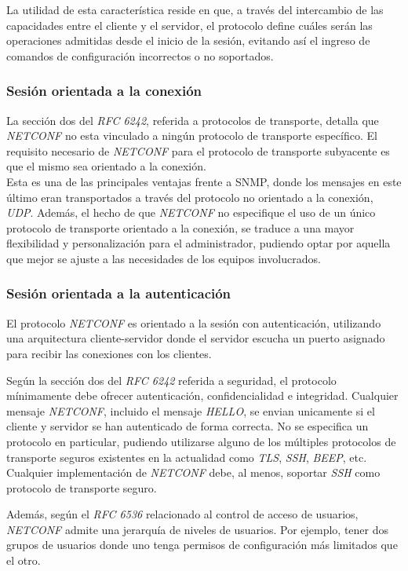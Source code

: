   La utilidad de esta característica reside en que, a través del intercambio de las capacidades entre el cliente y el servidor, el protocolo define cuáles serán las operaciones admitidas desde el inicio de la sesión, evitando así el ingreso de comandos de configuración incorrectos o no soportados. 


  \subsubsection{Sesión orientada a la conexión}
  La sección dos del \textit{RFC 6242}, referida a protocolos de transporte, detalla que \textit{NETCONF} no esta vinculado a ningún protocolo de transporte específico. El requisito necesario de \textit{NETCONF} para el protocolo de transporte subyacente es que el mismo sea orientado a la conexión. 
  \\

  Esta es una de las principales ventajas frente a SNMP, donde los mensajes en este último eran transportados a través del protocolo no orientado a la conexión, \textit{UDP}. Además, el hecho de que \textit{NETCONF} no especifique el uso de un único protocolo de transporte orientado a la conexión, se traduce a una mayor flexibilidad y personalización para el administrador, pudiendo optar por aquella que mejor se ajuste a las necesidades de los equipos involucrados.


  \subsubsection{Sesión orientada a la autenticación}
  El protocolo \textit{NETCONF} es orientado a la sesión con autenticación, utilizando una arquitectura cliente-servidor donde el servidor escucha un puerto asignado para recibir las conexiones con los clientes. 

  Según la sección dos del \textit{RFC 6242} referida a seguridad, el protocolo mínimamente debe ofrecer autenticación, confidencialidad e integridad. Cualquier mensaje \textit{NETCONF}, incluido el mensaje \textit{HELLO}, se envian unicamente si el cliente y servidor se han autenticado de forma correcta. No se especifica un protocolo en particular, pudiendo utilizarse alguno de los múltiples protocolos de transporte seguros existentes en la actualidad como \textit{TLS}, \textit{SSH}, \textit{BEEP}, etc. Cualquier implementación de \textit{NETCONF} debe, al menos, soportar \textit{SSH} como protocolo de transporte seguro.

  Además, según el \textit{RFC 6536} relacionado al control de acceso de usuarios, \textit{NETCONF} admite una jerarquía de niveles de usuarios. Por ejemplo, tener dos grupos de usuarios donde uno tenga permisos de configuración más limitados que el otro.

